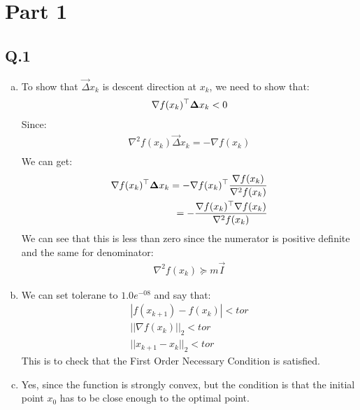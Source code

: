 \documentclass[12pt,twoside]{article}
\begin{document}



\section{Part 1}


\subsection{Q.1}


\begin{enumerate}[a)]
\item
To show that $\vec{\Delta} x_k$ is descent direction at $x_k$, we need to show that:
\begin{align}
\nabla f(x_k)^\top {\boldsymbol{{\Delta}}} x_k < 0 \\
\end{align}
Since:
\begin{align}
\nabla^2 f(x_k) \vec{\Delta} x_k = - \nabla f(x_k)\\
\end{align}
We can get:
\begin{align}
\nabla f(x_k)^\top {\boldsymbol{{\Delta}}} x_k = - \nabla f(x_k)^\top  \frac{\nabla f(x_k)}{\nabla^2 f(x_k)}\\
= - \frac{\nabla f(x_k)^\top \nabla f(x_k)}{\nabla^2 f(x_k)}
\end{align}
We can see that this is less than zero since the numerator is positive definite and the same for denominator:
\begin{align}
\nabla^2 f(x_k) \succeq m\vec{I}
\end{align}



\item
We can set tolerane to $1.0e^{-08}$ and say that:
\begin{align}
|f(x_{k+1}) - f(x_k)| < tor\\
||\nabla f(x_k)||_2 < tor\\
||x_{k+1} - x_k||_2 < tor
\end{align}
This is to check that the First Order Necessary Condition is satisfied.

\item
Yes, since the function is strongly convex, but the condition is that the initial point $x_0$ has to be close enough to the optimal point.


\end{enumerate}
\end{document}
